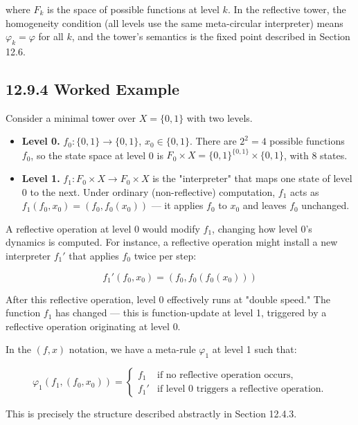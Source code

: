 where $F_k$ is the space of possible functions at level $k$. In the reflective tower, the homogeneity condition (all levels use the same meta-circular interpreter) means $\varphi_k = \varphi$ for all $k$, and the tower's semantics is the fixed point described in Section 12.6.

\subsection{12.9.4 Worked Example}

Consider a minimal tower over $X = \{ 0, 1\} $ with two levels.

\begin{itemize}
  \item \textbf{Level 0.} $f_0: \{ 0, 1\}  \to \{ 0, 1\} $, $x_0 \in \{ 0, 1\} $. There are $2^2 = 4$ possible functions $f_0$, so the state space at level 0 is $F_0 \times X = \{ 0,1\} ^{\{ 0,1\} } \times \{ 0,1\} $, with 8 states.
\end{itemize}

\begin{itemize}
  \item \textbf{Level 1.} $f_1: F_0 \times X \to F_0 \times X$ is the "interpreter" that maps one state of level 0 to the next. Under ordinary (non-reflective) computation, $f_1$ acts as $f_1(f_0, x_0) = (f_0, f_0(x_0))$ --- it applies $f_0$ to $x_0$ and leaves $f_0$ unchanged.
\end{itemize}

A reflective operation at level 0 would modify $f_1$, changing how level 0's dynamics is computed. For instance, a reflective operation might install a new interpreter $f_1'$ that applies $f_0$ twice per step:

\[
f_1'(f_0, x_0) = (f_0, f_0(f_0(x_0)))
\]

After this reflective operation, level 0 effectively runs at "double speed." The function $f_1$ has changed --- this is function-update at level 1, triggered by a reflective operation originating at level 0.

In the $(f, x)$ notation, we have a meta-rule $\varphi_1$ at level 1 such that:

\[
\varphi_1(f_1, (f_0, x_0)) = \begin{cases} f_1 & \text{if no reflective operation occurs,} \\ f_1' & \text{if level 0 triggers a reflective operation.} \end{cases}
\]

This is precisely the structure described abstractly in Section 12.4.3.


